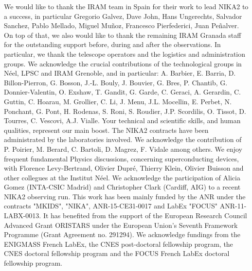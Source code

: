 \documentclass[]{aa} %
\begin{document}


\begin{acknowledgements}
We would like to thank the IRAM team in Spain for their work to lead NIKA2 to a success, in particular Gregorio Galvez, Dave John, Hans Ungerechts, Salvador Sanchez, Pablo Mellado, Miguel Mu\~noz, Francesco Pierfederici, Juan Pe\~nalver. On top of that, we also would like to thank the remaining IRAM Granada staff for the outstanding support before, during and after the observations. In particular, we thank the telescope operators and the logistics and administration groups. We acknowledge the crucial contributions of the technological groups in N\'eel, LPSC and IRAM Grenoble, and in particular: A. Barbier, E. Barria, D. Billon-Pierron, G. Bosson, J.-L. Bouly, J. Bouvier, G. Bres, P. Chantib, G. Donnier-Valentin,  O. Exshaw, T. Gandit, G. Garde, C. Geraci, A. Gerardin, C. Guttin, C. Hoarau, M. Grollier, C. Li, J. Menu, J.L. Mocellin, E. Perbet, N. Ponchant, G. Pont, H. Rodenas, S. Roni, S. Roudier, J.P. Scordilis, O. Tissot, D. Tourres, C. Vescovi, A.J. Vialle. Your technical and scientific skills, and human qualities, represent our main boost.  The NIKA2 contracts have been administrated by the laboratories involved. We acknowledge the contribution of P. Poirier, M. Berard, C. Bartoli, D. Magrez, F. Vidale among others. We enjoy frequent fundamental Physics discussions, concerning superconducting devices, with Florence Levy-Bertrand, Olivier Dupr\'e, Thierry Klein, Olivier Buisson and other collegues at the Institut N\'eel. We acknowledge the participation of Alicia Gomez (INTA-CSIC Madrid) and Christopher Clark (Cardiff, AIG) to a recent NIKA2 observing run. This work has been mainly funded by the ANR under the contracts "MKIDS", "NIKA", ANR-15-CE31-0017 and LabEx "FOCUS" ANR-11-LABX-0013. It has benefited from the support of the European Research Council Advanced Grant ORISTARS under the European Union's Seventh Framework Programme (Grant Agreement no. 291294). We acknowledge fundings from the ENIGMASS French LabEx, the CNES post-doctoral fellowship program, the CNES doctoral fellowship program and the FOCUS French LabEx doctoral fellowship program.

\end{acknowledgements}


%
%


%
% 
\end{document}
